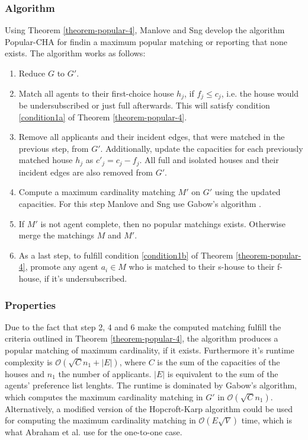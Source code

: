 \subsubsection{Algorithm}
Using Theorem \ref{theorem-popular-4}, Manlove and Sng develop the algorithm Popular-CHA for findin a maximum popular matching or reporting that none exists.\cite{ManlovePopularMatchings} The algorithm works as follows:
\begin{enumerate}
    \item Reduce $G$ to $G'$.
    \item Match all agents to their first-choice house $h_j$, if $f_j \leq c_j$, i.e. the house would be undersubscribed or just full afterwards. This will satisfy condition \ref{condition1a} of Theorem \ref{theorem-popular-4}.
    \item Remove all applicants and their incident edges, that were matched in the previous step, from $G'$. Additionally, update the capacities for each previously matched house $h_j$ as $c'_j = c_j - f_j$. All full and isolated houses and their incident edges are also removed from $G'$.
    \item Compute a maximum cardinality matching $M'$ on $G'$ using the updated capacities. For this step Manlove and Sng use Gabow's algorithm \cite{Gabow1983}.
    \item If $M'$ is not agent complete, then no popular matchings exists. Otherwise merge the matchings $M$ and $M'$.
    \item As a last step, to fulfill condition \ref{condition1b} of Theorem \ref{theorem-popular-4}, promote any agent $a_i \in M$ who is matched to their s-house to their f-house, if it's undersubscribed. 
\end{enumerate}


\subsubsection{Properties}
Due to the fact that step 2, 4 and 6 make the computed matching fulfill the criteria outlined in Theorem \ref{theorem-popular-4}, the algorithm produces a popular matching of maximum cardinality, if it exists. Furthermore it's runtime complexity is $\mathcal{O}(\sqrt{C}n_1 + |E|)$, where $C$ is the sum of the capacities of the houses and $n_1$ the number of applicants. $|E|$ is equivalent to the sum of the agents' preference list lenghts. The runtime is dominated by Gabow's algorithm, which computes the maximum cardinality matching in $G'$ in $\mathcal{O}(\sqrt{C}n_1)$.\cite{ManlovePopularMatchings} Alternatively, a modified version of the Hopcroft-Karp algorithm could be used for computing the maximum cardinality matching in $\mathcal{O}(E\sqrt{V})$\cite{Hopcroft} time, which is what Abraham et al. use for the one-to-one case.


